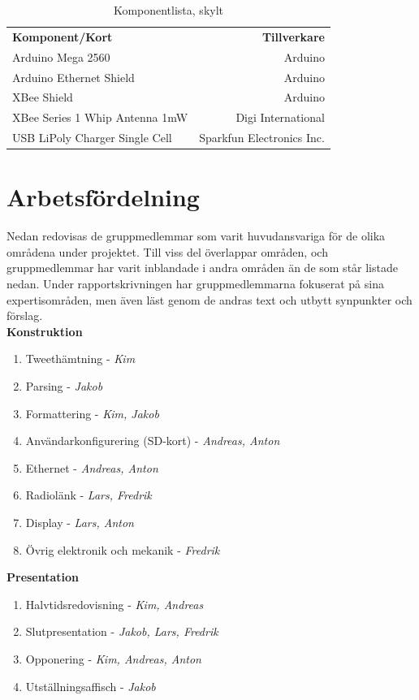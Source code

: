 \documentclass[a4paper,11pt]{article}
\begin{document}
\begin{table}[h]
\centering
	\begin{tabular}{|l|r|}
	{\bf Komponent/Kort} & {\bf Tillverkare} \\
	Arduino Mega 2560                  & Arduino \\
	Arduino Ethernet Shield            & Arduino \\
	XBee Shield                        & Arduino \\
	XBee Series 1 Whip Antenna 1mW     & Digi International \\
	USB LiPoly Charger Single Cell     & Sparkfun Electronics Inc. \\
	\end{tabular}
\caption{Komponentlista, skylt}
\label{tab:korttable_skylt}
\end{table}
\pagebreak

\section{Arbetsfördelning}
\label{sec:arbetsfordelning}
Nedan redovisas de gruppmedlemmar som varit huvudansvariga för de olika områdena under projektet. Till viss del överlappar områden, och gruppmedlemmar har varit inblandade i andra områden än de som står listade nedan. Under rapportskrivningen har gruppmedlemmarna fokuserat på sina expertisområden, men även läst genom de andras text och utbytt synpunkter och förslag.\\

{\bf Konstruktion}
	\begin{enumerate}
    	\item Tweethämtning - {\it Kim}
    	\item Parsing - {\it Jakob}
    	\item Formattering - {\it Kim, Jakob}
    	\item Användarkonfigurering (SD-kort) - {\it Andreas, Anton}
    	\item Ethernet - {\it Andreas, Anton}
    	\item Radiolänk - {\it Lars, Fredrik}
    	\item Display - {\it Lars, Anton}
    	\item Övrig elektronik och mekanik - {\it Fredrik}\\
    	\end{enumerate}
{\bf Presentation}
	\begin{enumerate}
 	\item Halvtidsredovisning - {\it Kim, Andreas}
    	\item Slutpresentation - {\it Jakob, Lars, Fredrik}
    	\item Opponering - {\it Kim, Andreas, Anton}
    	\item Utställningsaffisch - {\it Jakob}\\
	\end{enumerate}
\pagebreak
\end{document}
